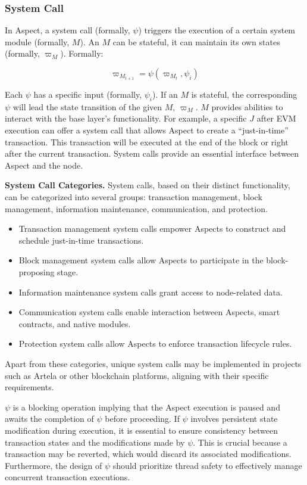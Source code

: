 \subsubsection{System Call}

In Aspect, a system call (formally, $\psi$) triggers the execution of a certain system module (formally, $M$). An $M$ can be stateful, it can maintain its own states (formally, $\varpi_{M}$). Formally: 

$$
\varpi_{M_{t+1}}=\psi(\varpi_{M_t},\psi_i)
$$

Each $\psi$ has a specific input (formally, $\psi_i$). If an $M$ is stateful, the corresponding $\psi$ will lead the state transition of the given $M$, $\varpi_{M}$. $M$ provides abilities to interact with the base layer’s functionality. For example, a specific $J$ after EVM execution can offer a system call that allows Aspect to create a “just-in-time” transaction. This transaction will be executed at the end of the block or right after the current transaction. System calls provide an essential interface between Aspect and the node.

\textbf{System Call Categories.} System calls, based on their distinct functionality, can be categorized into several groups: transaction management, block management, information maintenance, communication, and protection.

\begin{itemize}
  \item Transaction management system calls empower Aspects to construct and schedule just-in-time transactions.
  \item Block management system calls allow Aspects to participate in the block-proposing stage.
  \item Information maintenance system calls grant access to node-related data.
  \item Communication system calls enable interaction between Aspects, smart contracts, and native modules.
  \item Protection system calls allow Aspects to enforce transaction lifecycle rules.
\end{itemize}

Apart from these categories, unique system calls may be implemented in projects such as Artela or other blockchain platforms, aligning with their specific requirements.

$\psi$ is a blocking operation implying that the Aspect execution is paused and awaits the completion of $\psi$ before proceeding. If $\psi$ involves persistent state modification during execution, it is essential to ensure consistency between transaction states and the modifications made by $\psi$. This is crucial because a transaction may be reverted, which would discard its associated modifications. Furthermore, the design of $\psi$ should prioritize thread safety to effectively manage concurrent transaction executions.

